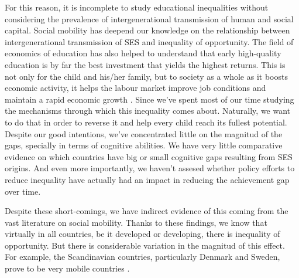 \documentclass[11pt, a4paper]{article}\usepackage[]{graphicx}\usepackage[]{color}
\begin{document}
For this reason, it is incomplete to study educational inequalities without considering the prevalence of intergenerational transmission of human and social capital. Social mobility has deepend our knowledge on the relationship between intergenerational transmission of SES and inequality of opportunity. The field of economics of education has also helped to understand that early high-quality education is by far the best investment that yields the highest returns. This is not only for the child and his/her family, but to society as a whole as it boosts economic activity, it helps the labour market improve job conditions and maintain a rapid economic growth \citep{hanushek2007}. Since \citet{coleman1966} we've spent most of our time studying the mechanisms through which this inequality comes about. Naturally, we want to do that in order to reverse it and help every child reach its fullest potential. Despite our good intentions, we've concentrated little on the magnitud of the gaps, specially in terms of cognitive abilities. We have very little comparative evidence on which countries have big or small cognitive gaps resulting from SES origins. And even more importantly, we haven't assesed whether policy efforts to reduce inequality have actually had an impact in reducing the achievement gap over time.

Despite these short-comings, we have indirect evidence of this coming from the vast literature on social mobility. Thanks to these findings, we know that virtually in all countries, be it developed or developing, there is inequality of opportunity. But there is considerable variation in the magnitud of this effect. For example, the Scandinavian countries, particularly Denmark and Sweden, prove to be very mobile countries \citep{esping2012, breen2007, shavit1993}.
\end{document}
